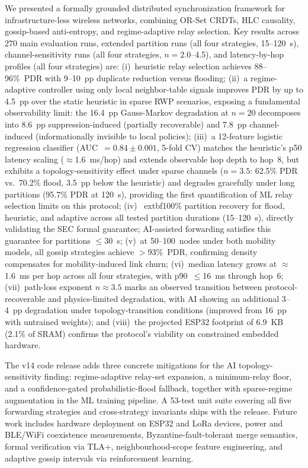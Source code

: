 \documentclass[conference]{IEEEtran}
\begin{document}
We presented a formally grounded distributed synchronization framework for
infrastructure-less wireless networks, combining OR-Set CRDTs, HLC causality,
gossip-based anti-entropy, and regime-adaptive relay selection.  Key results
across 270 main evaluation runs, extended partition runs (all four strategies, 15--120~s),
channel-sensitivity runs (all four strategies, $n=2.0$--4.5), and latency-by-hop
profiles (all four strategies) are:
(i)~heuristic relay selection achieves 88--96\%~PDR with 9--10~pp duplicate reduction
versus flooding; (ii)~a regime-adaptive controller using only local neighbor-table
signals improves PDR by up to 4.5~pp over the static heuristic in sparse RWP scenarios,
exposing a fundamental observability limit: the 16.4~pp Gauss-Markov degradation
at $n=20$ decomposes into 8.6~pp suppression-induced (partially recoverable) and 7.8~pp
channel-induced (informationally invisible to local policies); (iii)~a 12-feature
logistic regression classifier (AUC~$=0.84\pm0.001$, 5-fold CV) matches the
heuristic's p50 latency scaling ($\approx$1.6~ms/hop) and extends observable hop depth
to hop~8, but exhibits a topology-sensitivity effect under sparse channels ($n=3.5$:
62.5\% PDR vs.\ 70.2\% flood, 3.5~pp below the heuristic) and degrades gracefully
under long partitions (95.7\% PDR at 120~s),
providing the first quantification of ML relay selection limits on this protocol;
(iv)~	extbf{100\% partition recovery} for flood, heuristic, and adaptive across all
tested partition durations (15--120~s), directly validating the SEC formal guarantee;
AI-assisted forwarding satisfies this guarantee for partitions $\leq$30~s;
(v)~at 50--100~nodes under both mobility models, all gossip strategies achieve
$>$93\%~PDR, confirming density compensates for mobility-induced link churn;
(vi)~median latency grows at $\approx$1.6~ms per hop across all four strategies,
with p90~$\leq$16~ms through hop~6; (vii)~path-loss exponent $n\approx3.5$
marks an observed transition between protocol-recoverable and physics-limited degradation,
with AI showing an additional 3--4~pp degradation under topology-transition conditions (improved from 16~pp with untrained weights);
and (viii)~the projected ESP32 footprint of 6.9~KB (2.1\% of SRAM) confirms the
protocol's viability on constrained embedded hardware.

The v14 code release adds three concrete mitigations for the AI topology-sensitivity
finding: regime-adaptive relay-set expansion, a minimum-relay floor, and a
confidence-gated probabilistic-flood fallback, together with sparse-regime
augmentation in the ML training pipeline.  A 53-test unit suite covering all five
forwarding strategies and cross-strategy invariants ships with the release.
Future work includes hardware deployment on ESP32 and LoRa devices,
power and BLE/WiFi coexistence measurements, Byzantine-fault-tolerant merge
semantics, formal verification via TLA+, neighbourhood-scope feature engineering,
and adaptive gossip intervals via reinforcement learning.



\end{document}
